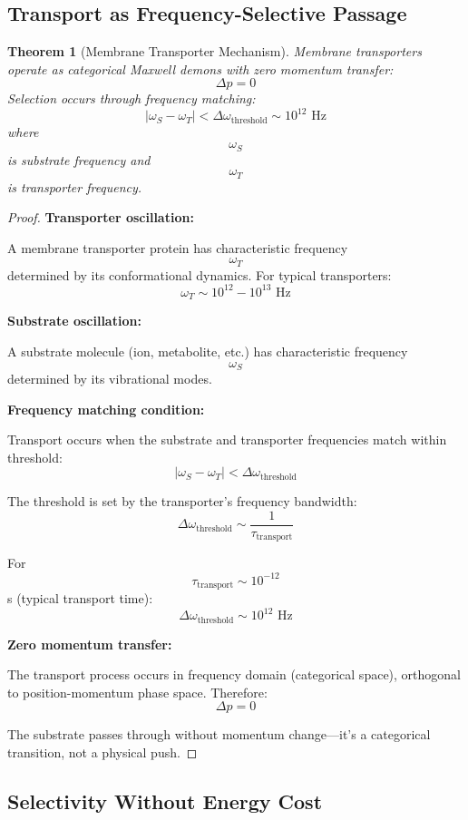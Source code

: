 \documentclass[12pt,a4paper]{article}
\newtheorem{theorem}{Theorem}
\begin{document}
\subsection{Transport as Frequency-Selective Passage}

\begin{theorem}[Membrane Transporter Mechanism]
Membrane transporters operate as categorical Maxwell demons with zero momentum transfer:
$$
\Delta p = 0
$$
Selection occurs through frequency matching:
$$
|\omega_S - \omega_T| < \Delta\omega_{\text{threshold}} \sim 10^{12} \text{ Hz}
$$
where $$\omega_S$$ is substrate frequency and $$\omega_T$$ is transporter frequency.
\end{theorem}

\begin{proof}
\textbf{Transporter oscillation:}

A membrane transporter protein has characteristic frequency $$\omega_T$$ determined by its conformational dynamics. For typical transporters:
$$
\omega_T \sim 10^{12} - 10^{13} \text{ Hz}
$$

\textbf{Substrate oscillation:}

A substrate molecule (ion, metabolite, etc.) has characteristic frequency $$\omega_S$$ determined by its vibrational modes.

\textbf{Frequency matching condition:}

Transport occurs when the substrate and transporter frequencies match within threshold:
$$
|\omega_S - \omega_T| < \Delta\omega_{\text{threshold}}
$$

The threshold is set by the transporter's frequency bandwidth:
$$
\Delta\omega_{\text{threshold}} \sim \frac{1}{\tau_{\text{transport}}}
$$

For $$\tau_{\text{transport}} \sim 10^{-12}$$ s (typical transport time):
$$
\Delta\omega_{\text{threshold}} \sim 10^{12} \text{ Hz}
$$

\textbf{Zero momentum transfer:}

The transport process occurs in frequency domain (categorical space), orthogonal to position-momentum phase space. Therefore:
$$
\Delta p = 0
$$

The substrate passes through without momentum change—it's a categorical transition, not a physical push.
\end{proof}

\subsection{Selectivity Without Energy Cost}
\end{document}
